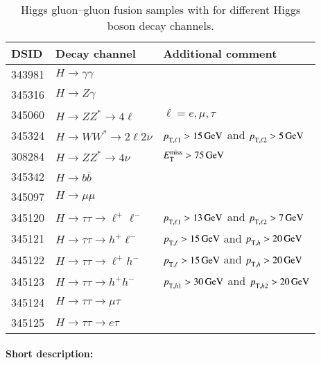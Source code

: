 \begin{table}[!htbp]
  \caption{\POWHEG Higgs gluon--gluon fusion samples with \POWPY[8] for different Higgs boson decay channels.}%
  \label{tab:higgs-ggH-samples}
  \centering
  \begin{tabular}{ l | l | l}
    \toprule
    DSID   & Decay channel & Additional comment \\
    \midrule
    343981 & \(H\to\gamma\gamma\)&   \\
    345316 & \(H\to Z\gamma\) & \\
    345060 & \(H\to ZZ^{*} \to 4\ell \) & \(\ell=e,\mu,\tau\)   \\
    345324 & \(H\to WW^{*} \to 2\ell2\nu \) &  \(\pTX[][\ell1] > \qty{15}{\GeV}\) and \(\pTX[][\ell2] > \qty{5}{\GeV}\) \\
    308284 & \(H\to ZZ^{*}\to 4\nu\) & \(E_{\text{T}}^{\text{miss}} > \SI{75}{\ensuremath{\text{GeV}}}\)\\
    345342 & \(H\to b \bar{b}\) & \\
    345097 & \(H\to\mu\mu\)      &     \\
    345120 & \(H\to\tau\tau\to \ell^{+}\ell^{-}\) & \(\pTX[][\ell1] > \qty{13}{\GeV}\) and \(\pTX[][\ell2] > \qty{7}{\GeV}\) \\
    345121 & \(H\to\tau\tau\to h^{+}\ell^{-}\)    & \(\pTX[][\ell]  > \qty{15}{\GeV}\) and \(\pTX[][h]     > \qty{20}{\GeV}\) \\
    345122 & \(H\to\tau\tau\to \ell^{+}h^{-}\)    & \(\pTX[][\ell]  > \qty{15}{\GeV}\) and \(\pTX[][h]     > \qty{20}{\GeV}\) \\
    345123 & \(H\to\tau\tau\to h^{+}h^{-}\)       & \(\pTX[][h1]    > \qty{30}{\GeV}\) and \(\pTX[][h2]    > \qty{20}{\GeV}\) \\
    345124 & \(H\to\tau\tau\to \mu\tau\)          & \\ %
    345125 & \(H\to\tau\tau\to e \tau\)           & \\ %
    \bottomrule
  \end{tabular}
\end{table}

\paragraph{Short description:}

